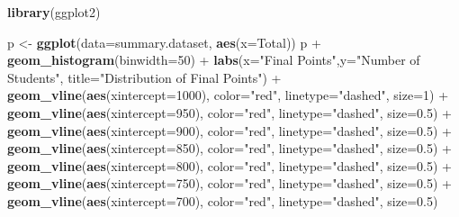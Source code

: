 \documentclass[]{article}
\newenvironment{Shaded}{\begin{snugshade}}{\end{snugshade}}
\newcommand{\KeywordTok}[1]{\textcolor[rgb]{0.13,0.29,0.53}{\textbf{{#1}}}}
\newcommand{\DataTypeTok}[1]{\textcolor[rgb]{0.13,0.29,0.53}{{#1}}}
\newcommand{\DecValTok}[1]{\textcolor[rgb]{0.00,0.00,0.81}{{#1}}}
\newcommand{\FloatTok}[1]{\textcolor[rgb]{0.00,0.00,0.81}{{#1}}}
\newcommand{\StringTok}[1]{\textcolor[rgb]{0.31,0.60,0.02}{{#1}}}
\newcommand{\NormalTok}[1]{{#1}}
\begin{document}
\begin{Shaded}
\begin{Highlighting}[]
\KeywordTok{library}\NormalTok{(ggplot2)}

\NormalTok{p <-}\StringTok{ }\KeywordTok{ggplot}\NormalTok{(}\DataTypeTok{data=}\NormalTok{summary.dataset, }\KeywordTok{aes}\NormalTok{(}\DataTypeTok{x=}\NormalTok{Total)) }
\NormalTok{p +}\StringTok{ }\KeywordTok{geom_histogram}\NormalTok{(}\DataTypeTok{binwidth=}\DecValTok{50}\NormalTok{) +}
\StringTok{  }\KeywordTok{labs}\NormalTok{(}\DataTypeTok{x=}\StringTok{"Final Points"}\NormalTok{,}\DataTypeTok{y=}\StringTok{"Number of Students"}\NormalTok{, }\DataTypeTok{title=}\StringTok{"Distribution of Final Points"}\NormalTok{) +}
\StringTok{  }\KeywordTok{geom_vline}\NormalTok{(}\KeywordTok{aes}\NormalTok{(}\DataTypeTok{xintercept=}\DecValTok{1000}\NormalTok{), }\DataTypeTok{color=}\StringTok{"red"}\NormalTok{, }\DataTypeTok{linetype=}\StringTok{"dashed"}\NormalTok{, }\DataTypeTok{size=}\DecValTok{1}\NormalTok{) +}
\StringTok{  }\KeywordTok{geom_vline}\NormalTok{(}\KeywordTok{aes}\NormalTok{(}\DataTypeTok{xintercept=}\DecValTok{950}\NormalTok{), }\DataTypeTok{color=}\StringTok{"red"}\NormalTok{, }\DataTypeTok{linetype=}\StringTok{"dashed"}\NormalTok{, }\DataTypeTok{size=}\FloatTok{0.5}\NormalTok{) +}
\StringTok{  }\KeywordTok{geom_vline}\NormalTok{(}\KeywordTok{aes}\NormalTok{(}\DataTypeTok{xintercept=}\DecValTok{900}\NormalTok{), }\DataTypeTok{color=}\StringTok{"red"}\NormalTok{, }\DataTypeTok{linetype=}\StringTok{"dashed"}\NormalTok{, }\DataTypeTok{size=}\FloatTok{0.5}\NormalTok{) +}
\StringTok{  }\KeywordTok{geom_vline}\NormalTok{(}\KeywordTok{aes}\NormalTok{(}\DataTypeTok{xintercept=}\DecValTok{850}\NormalTok{), }\DataTypeTok{color=}\StringTok{"red"}\NormalTok{, }\DataTypeTok{linetype=}\StringTok{"dashed"}\NormalTok{, }\DataTypeTok{size=}\FloatTok{0.5}\NormalTok{) +}
\StringTok{  }\KeywordTok{geom_vline}\NormalTok{(}\KeywordTok{aes}\NormalTok{(}\DataTypeTok{xintercept=}\DecValTok{800}\NormalTok{), }\DataTypeTok{color=}\StringTok{"red"}\NormalTok{, }\DataTypeTok{linetype=}\StringTok{"dashed"}\NormalTok{, }\DataTypeTok{size=}\FloatTok{0.5}\NormalTok{) +}
\StringTok{  }\KeywordTok{geom_vline}\NormalTok{(}\KeywordTok{aes}\NormalTok{(}\DataTypeTok{xintercept=}\DecValTok{750}\NormalTok{), }\DataTypeTok{color=}\StringTok{"red"}\NormalTok{, }\DataTypeTok{linetype=}\StringTok{"dashed"}\NormalTok{, }\DataTypeTok{size=}\FloatTok{0.5}\NormalTok{) +}
\StringTok{  }\KeywordTok{geom_vline}\NormalTok{(}\KeywordTok{aes}\NormalTok{(}\DataTypeTok{xintercept=}\DecValTok{700}\NormalTok{), }\DataTypeTok{color=}\StringTok{"red"}\NormalTok{, }\DataTypeTok{linetype=}\StringTok{"dashed"}\NormalTok{, }\DataTypeTok{size=}\FloatTok{0.5}\NormalTok{) }
\end{Highlighting}
\end{Shaded}
\end{document}
